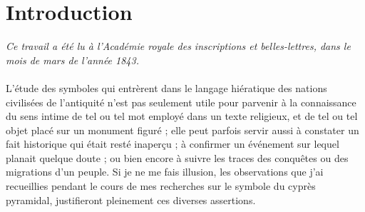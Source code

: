 \documentclass[a4paper, 11pt, oneside, polutonikogreek, french]{article}
\begin{document}
\section*{Introduction}
\begin{center}
\footnotesize
\emph{Ce travail a été lu à l'Académie royale des inscriptions et belles-lettres, dans le mois de mars de l'année 1843.}
\end{center}
\paragraph{}
L'étude des symboles qui entrèrent dans le langage hiératique des nations civilisées de l'antiquité n'est pas seulement utile pour parvenir à la connaissance du sens intime de tel ou tel mot employé dans un texte religieux, et de tel ou tel objet placé sur un monument figuré ; elle peut parfois servir aussi à constater un fait historique qui était resté inaperçu ; à confirmer un événement sur lequel planait quelque doute ; ou bien encore à suivre les traces des conquêtes ou des migrations d'un peuple. Si je ne me fais illusion, les observations que j'ai recueillies pendant le cours de mes recherches sur le symbole du cyprès pyramidal, justifieront pleinement ces diverses assertions.
\end{document}
